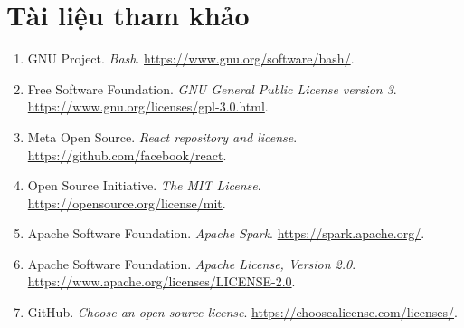 \documentclass[12pt,a4paper]{article}
\begin{document}
\section*{Tài liệu tham khảo}\label{sec:sources}
\begin{enumerate}[leftmargin=*]
\item GNU Project. \emph{Bash}. \url{https://www.gnu.org/software/bash/}.
\item Free Software Foundation. \emph{GNU General Public License version 3}. \url{https://www.gnu.org/licenses/gpl-3.0.html}.
\item Meta Open Source. \emph{React repository and license}. \url{https://github.com/facebook/react}.
\item Open Source Initiative. \emph{The MIT License}. \url{https://opensource.org/license/mit}.
\item Apache Software Foundation. \emph{Apache Spark}. \url{https://spark.apache.org/}.
\item Apache Software Foundation. \emph{Apache License, Version 2.0}. \url{https://www.apache.org/licenses/LICENSE-2.0}.
\item GitHub. \emph{Choose an open source license}. \url{https://choosealicense.com/licenses/}.
\end{enumerate}
\end{document}
